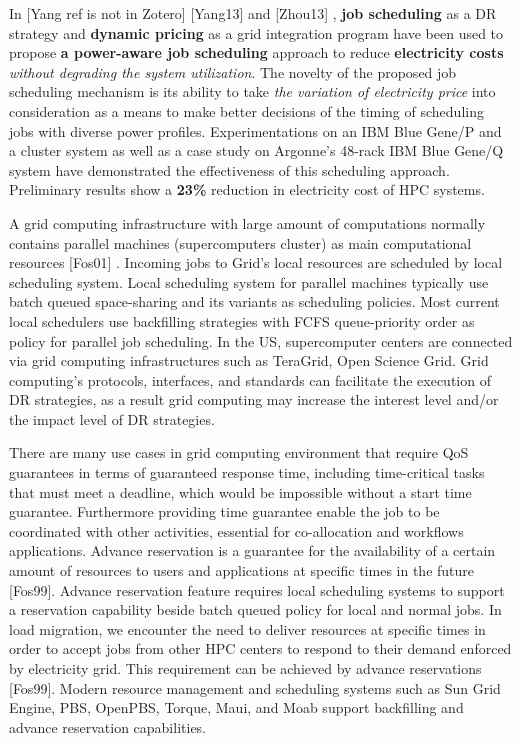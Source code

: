 \documentclass{llncs}
\begin{document}
In 
[Yang ref is not in Zotero] 
\cite{zhou_reducing_2013}
[Yang13] and [Zhou13] , \textbf{job scheduling} as a DR strategy and
\textbf{dynamic pricing} as a grid integration program have been used to
propose \textbf{a power-aware job scheduling} approach to reduce
\textbf{electricity costs} \textit{without degrading the system utilization}. 
The novelty of the proposed job scheduling
mechanism is its ability to take \textit{the variation of 
electricity price }into consideration as a means to make
better decisions of the timing of scheduling jobs with diverse power
profiles. Experimentations on an IBM Blue Gene/P and a cluster system as
well as a case study on Argonne's 48-rack IBM Blue Gene/Q system have
demonstrated the effectiveness of this scheduling approach. Preliminary
results show a \textbf{23{\%}} reduction in electricity cost of HPC systems.

A grid computing infrastructure with large amount of computations normally
contains parallel machines (supercomputers cluster) as main computational
resources 
\cite{foster_anatomy_2001} [Fos01]
. Incoming jobs to Grid's local resources are scheduled by
local scheduling system. Local scheduling system for parallel machines
typically use batch queued space-sharing and its variants as scheduling
policies. Most current local schedulers use backfilling strategies with FCFS
queue-priority order as policy for parallel job scheduling. In the US,
supercomputer centers are connected via grid computing infrastructures such
as TeraGrid, Open Science Grid. Grid computing's protocols, interfaces, and
standards can facilitate the execution of DR strategies, as a result grid
computing may increase the interest level and/or the impact level of DR
strategies.

There are many use cases in grid computing environment that require QoS
guarantees in terms of guaranteed response time, including time-critical
tasks that must meet a deadline, which would be impossible without a start
time guarantee. Furthermore providing time guarantee enable the job to be
coordinated with other activities, essential for co-allocation and workflows
applications. Advance reservation is a guarantee for the availability of a
certain amount of resources to users and applications at specific times in
the future 
\cite{foster_distributed_1999} [Fos99]. Advance reservation feature requires local scheduling
systems to support a reservation capability beside batch queued policy for
local and normal jobs. In load migration, we encounter the need to deliver
resources at specific times in order to accept jobs from other HPC centers
to respond to their demand enforced by electricity grid. This requirement
can be achieved by advance reservations 
\cite{foster_distributed_1999}
[Fos99]. Modern resource management
and scheduling systems such as Sun Grid Engine, PBS, OpenPBS, Torque, Maui,
and Moab support backfilling and advance reservation capabilities.
\end{document}
